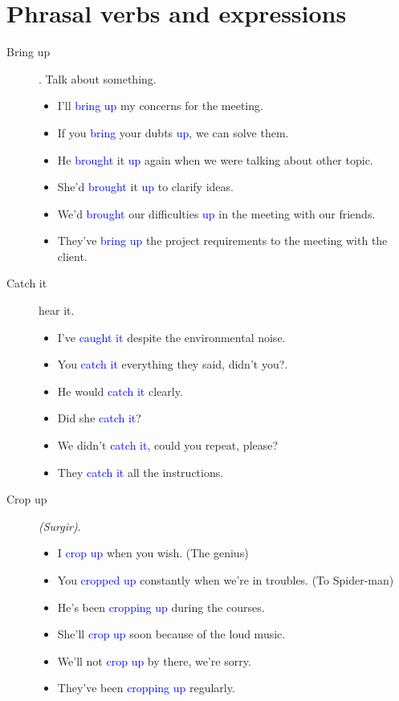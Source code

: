 \section{Phrasal verbs and expressions}
\begin{multicols}{2}
\begin{description}
\item [Bring up]. Talk about something.
\begin{itemize}
\item I'll \textcolor{blue}{bring up} my concerns for the meeting.
\item If you \textcolor{blue}{bring} your dubts \textcolor{blue}{up}, we can solve them.
\item He \textcolor{blue}{brought} it \textcolor{blue}{up} again when we were talking about other topic.
\item She'd \textcolor{blue}{brought} it \textcolor{blue}{up} to clarify ideas.
\item We'd \textcolor{blue}{brought} our difficulties \textcolor{blue}{up} in the meeting with our friends.
\item They've \textcolor{blue}{bring up} the project requirements to the meeting with the client.
\end{itemize}

\item[Catch it] hear it.
\begin{itemize}
\item I've \textcolor{blue}{caught it} despite the environmental noise.
\item You \textcolor{blue}{catch it} everything they said, didn't you?.
\item He would \textcolor{blue}{catch it} clearly.
\item Did she \textcolor{blue}{catch it}?
\item We didn't \textcolor{blue}{catch it}, could you repeat, please?
\item They \textcolor{blue}{catch it} all the instructions.
\end{itemize}
\item [Crop up] \emph{(Surgir)}.
\begin{itemize}
\item I \textcolor{blue}{crop up} when you wish. (The genius)
\item You \textcolor{blue}{cropped up} constantly when we're in troubles. (To Spider-man)
\item He's been \textcolor{blue}{cropping up} during the courses.
\item She'll \textcolor{blue}{crop up} soon because of the loud music.
\item We'll not \textcolor{blue}{crop up} by there, we're sorry.
\item They've been \textcolor{blue}{cropping up} regularly.
\end{itemize}


\end{description}
\end{multicols}
